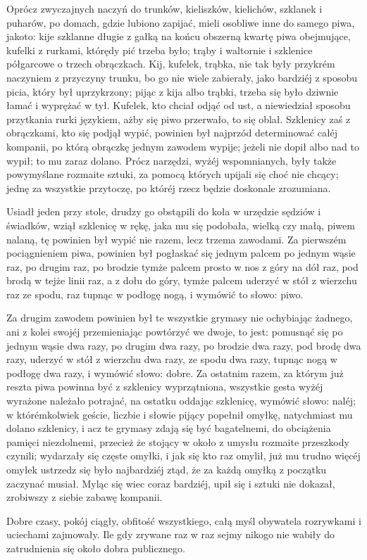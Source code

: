 \documentclass{book}
\begin{document}
Oprócz zwyczajnych naczyń do trunków, kieliszków, kielichów, szklanek i puharów, po domach, gdzie lubiono zapijać, mieli osobliwe inne do samego piwa, jakoto: kije szklanne długie z gałką na końcu obszerną kwartę piwa obejmujące, kufelki z rurkami, którędy pić trzeba było; trąby i waltornie i szklenice półgarcowe o trzech obrączkach. Kij, kufelek, trąbka, nie tak były przykrém naczyniem z przyczyny trunku, bo go nie wiele zabierały, jako bardziéj z sposobu picia, który był uprzykrzony; pijąc z kija albo trąbki, trzeba się było dziwnie łamać i wyprężać w tył. Kufelek, kto chciał odjąć od ust, a niewiedział sposobu przytkania rurki językiem, ażby się piwo przerwało, to się oblał. Szklenicy zaś z obrączkami, kto się podjął wypić, powinien był najprzód determinować całéj kompanii, po którą obrączkę jednym zawodem wypije; jeżeli nie dopił albo nad to wypił; to mu zaraz dolano. Prócz narzędzi, wyżéj wspomnianych, były także powymyślane rozmaite sztuki, za pomocą których upijali się choć nie chcący; jednę za wszystkie przytoczę, po któréj rzecz będzie doskonale zrozumiana.

Usiadł jeden przy stole, drudzy go obstąpili do koła w urzędzie sędziów i świadków, wziął szklenicę w rękę, jaka mu się podobała, wielką czy małą, piwem nalaną, tę powinien był wypić nie razem, lecz trzema zawodami. Za pierwszém pociągnieniem piwa, powinien był pogłaskać się jednym palcem po jednym wąsie raz, po drugim raz, po brodzie tymże palcem prosto w nos z góry na dół raz, pod brodą w tejże linii raz, a z dołu do góry, tymże palcem uderzyć w stół z wierzchu raz ze spodu, raz tupnąc w podłogę nogą, i wymówić to słowo: piwo.

Za drugim zawodem powinien był te wszystkie grymasy nie ochybiając żadnego, ani z kolei swojéj przemieniając powtórzyć we dwoje, to jest: pomusnąć się po jednym wąsie dwa razy, po drugim dwa razy, po brodzie dwa razy, pod brodę dwa razy, uderzyć w stół z wierzchu dwa razy, ze spodu dwa razy, tupnąc nogą w podłogę dwa razy, i wymówić słowo: dobre. Za ostatnim razem, za którym już reszta piwa powinna być z szklenicy wyprzątniona, wszystkie gesta wyżéj wyrażone należało potrajać, na ostatku oddając szklenicę, wymówić słowo: naléj; w którémkolwiek geście, liczbie i słowie pijący popełnił omyłkę, natychmiast mu dolano szklenicy, i acz te grymasy zdają się być bagatelnemi, do obciążenia pamięci niezdolnemi, przecież że stojący w około z umysłu rozmaite przeszkody czynili; wydarzały się częste omyłki, i jak się kto raz omylił, już mu trudno więcéj omyłek ustrzedz się było najbardziéj ztąd, że za każdą omyłką z początku zaczynać musiał. Myląc się wiec coraz bardziéj, upił się i sztuki nie dokazał, zrobiwszy z siebie zabawę kompanii.

Dobre czasy, pokój ciągły, obfitość wszystkiego, całą myśl obywatela rozrywkami i uciechami zajmowały. Ile gdy zrywane raz w raz sejmy nikogo nie wabiły do zatrudnienia się około dobra publicznego.
  
\end{document}
